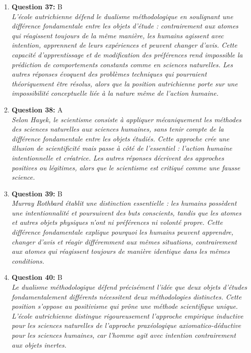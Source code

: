 \documentclass[12pt,a4paper]{article}
\begin{document}
\begin{enumerate}
\item \textbf{Question 37:} B
\\ \textit{L'école autrichienne défend le dualisme méthodologique en soulignant une différence fondamentale entre les objets d'étude : contrairement aux atomes qui réagissent toujours de la même manière, les humains agissent avec intention, apprennent de leurs expériences et peuvent changer d'avis. Cette capacité d'apprentissage et de modification des préférences rend impossible la prédiction de comportements constants comme en sciences naturelles. Les autres réponses évoquent des problèmes techniques qui pourraient théoriquement être résolus, alors que la position autrichienne porte sur une impossibilité conceptuelle liée à la nature même de l'action humaine.}

\item \textbf{Question 38:} A
\\ \textit{Selon Hayek, le scientisme consiste à appliquer mécaniquement les méthodes des sciences naturelles aux sciences humaines, sans tenir compte de la différence fondamentale entre les objets étudiés. Cette approche crée une illusion de scientificité mais passe à côté de l'essentiel : l'action humaine intentionnelle et créatrice. Les autres réponses décrivent des approches positives ou légitimes, alors que le scientisme est critiqué comme une fausse science.}

\item \textbf{Question 39:} B
\\ \textit{Murray Rothbard établit une distinction essentielle : les humains possèdent une intentionnalité et poursuivent des buts conscients, tandis que les atomes et autres objets physiques n'ont ni préférences ni volonté propre. Cette différence fondamentale explique pourquoi les humains peuvent apprendre, changer d'avis et réagir différemment aux mêmes situations, contrairement aux atomes qui réagissent toujours de manière identique dans les mêmes conditions.}

\item \textbf{Question 40:} B
\\ \textit{Le dualisme méthodologique défend précisément l'idée que deux objets d'études fondamentalement différents nécessitent deux méthodologies distinctes. Cette position s'oppose au positivisme qui prône une méthode scientifique unique. L'école autrichienne distingue rigoureusement l'approche empirique inductive pour les sciences naturelles de l'approche praxéologique axiomatico-déductive pour les sciences humaines, car l'homme agit avec intention contrairement aux objets inertes.}


\end{enumerate}
\end{document}
